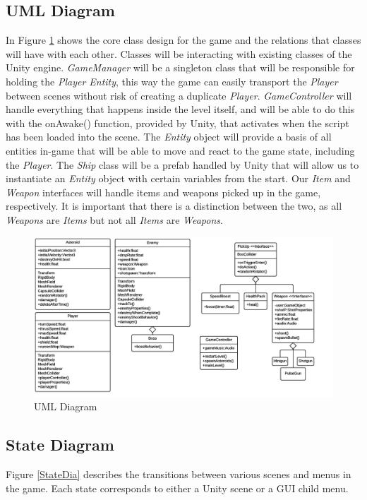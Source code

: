 \documentclass[12pt]{article}       %
\def\hs{\hspace{15pt}}
\begin{document}
\subsection{UML Diagram}
\hs In Figure \ref{UML} shows the core class design for the game and the relations that classes will have with each other. Classes will be interacting with existing classes of the Unity engine. {\it GameManager} will be a singleton class that will be responsible for holding the {\it Player Entity}, this way the game can easily transport the {\it Player} between scenes without risk of creating a duplicate {\it Player}. {\it GameController} will handle everything that happens inside the level itself, and will be able to do this with the onAwake() function, provided by Unity, that activates when the script has been loaded into the scene. The {\it Entity} object will provide a basis of all entities in-game that will be able to move and react to the game state, including the {\it Player}. The {\it Ship} class will be a prefab handled by Unity that will allow us to instantiate an {\it Entity} object with certain variables from the start. Our {\it Item} and {\it Weapon} interfaces will handle items and weapons picked up in the game, respectively. It is important that there is a distinction between the two, as all {\it Weapons} are {\it Items} but not all {\it Items} are {\it Weapons}.

\begin{figure} [H]
\centering
\includegraphics[width=7.3in]{FinalUMLHorizontal.png}
\caption{UML Diagram} \label{UML}
\end{figure}

\subsection{State Diagram}
Figure \ref{StateDia} describes the transitions between various scenes and menus in the game. Each state corresponds to either a Unity scene or a GUI child menu.
\end{document}
